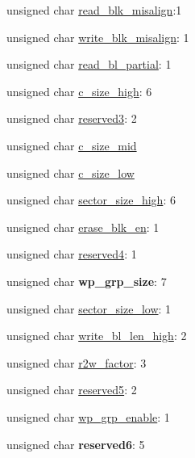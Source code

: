 \begin{DoxyCompactItemize}
\item 
unsigned char \hyperlink{struct_c_s_d_v2_a31c0f3174289d3fb8abade294770fc33}{read\-\_\-blk\-\_\-misalign}\-:1
\item 
unsigned char \hyperlink{struct_c_s_d_v2_a5fd0cab21c874fd49fc4ea5d537be201}{write\-\_\-blk\-\_\-misalign}\-: 1
\item 
unsigned char \hyperlink{struct_c_s_d_v2_a7387a4ab3ec1161c246ed02941e1325e}{read\-\_\-bl\-\_\-partial}\-: 1
\item 
unsigned char \hyperlink{struct_c_s_d_v2_a8ca62fc4ed0f6598005209d3c34f9c44}{c\-\_\-size\-\_\-high}\-: 6
\item 
unsigned char \hyperlink{struct_c_s_d_v2_a6525406821be82277577a768a2d4e904}{reserved3}\-: 2
\item 
unsigned char \hyperlink{struct_c_s_d_v2_a8cd3e8cdbf34be110b1d87b0c5f7b1d8}{c\-\_\-size\-\_\-mid}
\item 
unsigned char \hyperlink{struct_c_s_d_v2_a2af914ea8fe2b045432553e2d7c75bb7}{c\-\_\-size\-\_\-low}
\item 
unsigned char \hyperlink{struct_c_s_d_v2_a2580a4c6ddd99928402db34c2f650033}{sector\-\_\-size\-\_\-high}\-: 6
\item 
unsigned char \hyperlink{struct_c_s_d_v2_aa0ada858f4a1455c6cb4e9b7523d8fd1}{erase\-\_\-blk\-\_\-en}\-: 1
\item 
unsigned char \hyperlink{struct_c_s_d_v2_a1dcde2e7c54e279f4d7aac27d130cc17}{reserved4}\-: 1
\item 
\hypertarget{struct_c_s_d_v2_a3574bbe4ccfc7f26daa84efd98a9ff4c}{unsigned char {\bfseries wp\-\_\-grp\-\_\-size}\-: 7}\label{struct_c_s_d_v2_a3574bbe4ccfc7f26daa84efd98a9ff4c}

\item 
unsigned char \hyperlink{struct_c_s_d_v2_afcbc43e43942a772e79ef2aa55e37650}{sector\-\_\-size\-\_\-low}\-: 1
\item 
unsigned char \hyperlink{struct_c_s_d_v2_af31036ae33a6db8cf3db322fef249b48}{write\-\_\-bl\-\_\-len\-\_\-high}\-: 2
\item 
unsigned char \hyperlink{struct_c_s_d_v2_acbc1184d8705d3631d9492f927ccb8e8}{r2w\-\_\-factor}\-: 3
\item 
unsigned char \hyperlink{struct_c_s_d_v2_a6dd54d3f51fc8f0916d8882851d26d91}{reserved5}\-: 2
\item 
unsigned char \hyperlink{struct_c_s_d_v2_ab4247b023129bd89e0cebe8508b35f0a}{wp\-\_\-grp\-\_\-enable}\-: 1
\item 
\hypertarget{struct_c_s_d_v2_aa8656feb1159d94a13733e19da33d258}{unsigned char {\bfseries reserved6}\-: 5}\label{struct_c_s_d_v2_aa8656feb1159d94a13733e19da33d258}


\end{DoxyCompactItemize}
